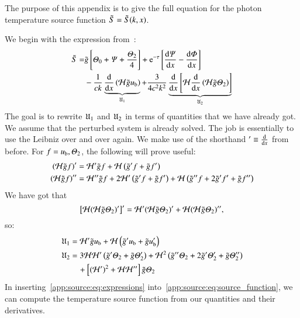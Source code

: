 

The purpose of this appendix is to give the full equation for the photon temperature source function $\tilde{S}=\tilde{S}(k, x)$.

We begin with the expression from~\citet[Eq.~(40)]{Callin2006}:
\begin{equation}\label{app:source:eq:source_function}
\begin{split}
    \tilde{S} =& \gti \left[\Theta_0 + \Psi + \frac{\Theta_2}{4}\right] + \eu[-\tau]\left[ \dv{\Psi}{x} -\dv{\Phi}{x} \right] \\
    &- \frac{1}{ck} \underbrace{\dv{}{x}\left(\Hp \gti u\ped{b} \right)}_{\expr_1}+ \frac{3}{4c^2k^2} \underbrace{\dv{}{x}\left[ \Hp \dv{}{x}\left(\Hp \gti\Theta_2 \right)  \right]}_{\expr_2}
\end{split}
\end{equation}
The goal is to rewrite $\mathfrak{U}_1$ and $\mathfrak{U}_2$ in terms of quantities that we have already got. We assume that the perturbed system is already solved. The job is essentially to use the Leibniz over and over again. We make use of the shorthand $'\equiv \dv{}{x}$ from before. For $f=u_\mathrm{b}, \varTheta_2 $, the following will prove useful:
\begin{subequations}
\begin{align}
    \left(\mathcal{H} \tilde{g} f \right)' &= \mathcal{H}'\tilde{g} f + \mathcal{H} \left( \tilde{g}' f + \tilde{g} f'\right)\\
    \left(\mathcal{H} \tilde{g} f \right)''&= \mathcal{H}'' \tilde{g} f + 2\mathcal{H}' \left(\tilde{g}' f + \tilde{g} f'\right) + \mathcal{H} \left(\tilde{g}'' f + 2\tilde{g}' f' + \tilde{g} f'' \right)
\end{align}
\end{subequations}
We have got that 
\begin{equation}
    \left[\mathcal{H} (\mathcal{H} \tilde{g} \varTheta_2)' \right]' = \mathcal{H}' (\mathcal{H} \tilde{g} \varTheta_2)' + \mathcal{H} (\mathcal{H} \tilde{g} \varTheta_2)'',
\end{equation}
so:
\begin{subequations}\label{app:source:eq:expressions}
\begin{align}
    \mathfrak{U}_1 &= \mathcal{H}'\tilde{g} u_\mathrm{b} + \mathcal{H} \left( \tilde{g}' u_\mathrm{b} + \tilde{g} u_\mathrm{b}'\right) \\
    \mathfrak{U}_2 &= 3\mathcal{H} \mathcal{H}' \left(\tilde{g}' \varTheta_2 + \tilde{g} \varTheta_2'\right) + \mathcal{H}^2\left(\tilde{g}'' \varTheta_2 +2 \tilde{g}' \varTheta_2' + \tilde{g} \varTheta_2''\right) \nonumber \\
    & \quad + \left[(\mathcal{H}')^2 + \mathcal{H} \mathcal{H}''\right]\tilde{g} \varTheta_2
\end{align}
\end{subequations}
In inserting~\cref{app:source:eq:expressions} into~\cref{app:source:eq:source_function}, we can compute the temperature source function from our quantities and their derivatives.



    
